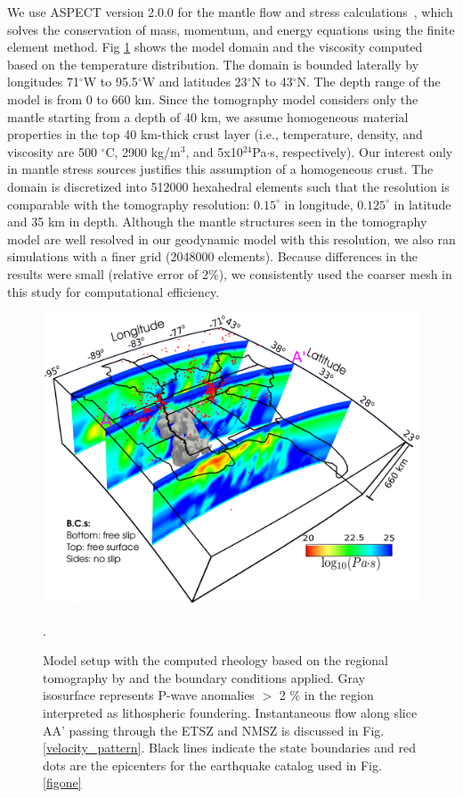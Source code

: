\documentclass[draft,linenumbers]{agujournal2018}
\begin{document}
    We use ASPECT version 2.0.0 for the mantle flow and stress calculations~\citep{heister_aspect_methods2,KHB12,aspect-doi-v2.0.0}, which solves the conservation of mass, momentum, and energy equations using the finite element method. Fig \ref{fig_model} shows the model domain and the viscosity computed based on the temperature distribution. The domain is bounded laterally by longitudes 71$^\circ$W to 95.5$^\circ$W and latitudes 23$^\circ$N to 43$^\circ$N. The depth range of the model is from 0 to 660 km. Since the tomography model considers only the mantle starting from a depth of 40 km, we assume homogeneous material properties in the top 40 km-thick crust layer (i.e., temperature, density, and viscosity are 500 $^{\circ}$C, 2900 kg/m$^{3}$, and 5x10$^{24}$Pa$\cdot$s, respectively). Our interest only in mantle stress sources justifies this assumption of a homogeneous crust. The domain is discretized into 512000 hexahedral elements such that the resolution is comparable with the tomography resolution: $0.15^\circ$ in longitude, $0.125^\circ$ in latitude and 35 km in depth. Although the mantle structures seen in the tomography model are well resolved in our geodynamic model with this resolution, we also ran simulations with a finer grid (2048000 elements). Because differences in the results were small (relative error of 2\%), we consistently used the coarser mesh in this study for computational efficiency.
%
\begin{figure}[ht]
    \centering
    \includegraphics[width=0.75\linewidth]{figures/model_figure.png}
    \caption{Model setup with the computed rheology based on the regional tomography by \citet{Biryol_2016} and the boundary conditions applied. Gray isosurface represents P-wave anomalies $>$ 2 \% in the region interpreted as lithospheric foundering. Instantaneous flow along slice AA' passing through the ETSZ and NMSZ is discussed in Fig. \ref{velocity_pattern}. Black lines indicate the state boundaries and red dots are the epicenters for the earthquake catalog used in Fig. \ref{figone}}.
    \label{fig_model}
 \end{figure}
    
\end{document}
